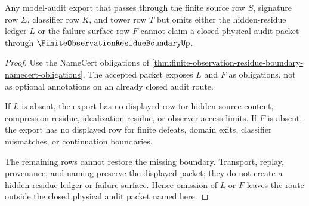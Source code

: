 \begin{theorem}
\label{thm:finite-observation-residue-boundary-audit-nonclosure}
Any model-audit export that passes through the finite source row $S$, signature row $\Sigma$, classifier row $K$, and tower row $T$ but omits either the hidden-residue ledger $L$ or the failure-surface row $F$ cannot claim a closed physical audit packet through $\FiniteObservationResidueBoundaryUp$.
\end{theorem}
\begin{proof}
Use the NameCert obligations of \autoref{thm:finite-observation-residue-boundary-namecert-obligations}. The accepted packet exposes $L$ and $F$ as obligations, not as optional annotations on an already closed audit route.

If $L$ is absent, the export has no displayed row for hidden source content, compression residue, idealization residue, or observer-access limits. If $F$ is absent, the export has no displayed row for finite defeats, domain exits, classifier mismatches, or continuation boundaries.

The remaining rows cannot restore the missing boundary. Transport, replay, provenance, and naming preserve the displayed packet; they do not create a hidden-residue ledger or failure surface. Hence omission of $L$ or $F$ leaves the route outside the closed physical audit packet named here.
\end{proof}

